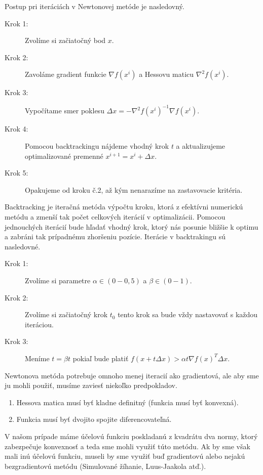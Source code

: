 Postup pri iteráciách v Newtonovej metóde je nasledovný.
\begin{description}
	\item[Krok 1:] {Zvolíme si začiatočný bod $x$.}
	\item[Krok 2:] {Zavoláme gradient funkcie $\nabla f(x^{i})$ a Hessovu maticu $\nabla^{2} f(x^{i})$.}
	\item[Krok 3:] {Vypočítame smer poklesu $\Delta x = -\nabla^{2}f(x^{i})^{-1} \nabla f(x^{i})$.}
	\item[Krok 4:] {Pomocou backtrackingu nájdeme vhodný krok $t$ a aktualizujeme optimalizované premenné $x^{i+1} = x^{i} + \Delta x $.}
	\item[Krok 5:] {Opakujeme od kroku č.2, až kým nenarazíme na zastavovacie kritéria.}
\end{description}
Backtracking je iteračná metóda výpočtu kroku, ktorá z efektívni numerickú metódu a zmenší tak počet celkových iterácií v optimalizácii. Pomocou jednouchých iterácií bude hľadať vhodný krok, ktorý nás posunie bližšie k optimu a zabráni tak prípadnému zhoršeniu pozície. Iterácie v backtrakingu sú nasledovné.
\begin{description}
	\item[Krok 1:] {Zvolíme si parametre $\alpha \in (0-0,5)$ a $\beta \in (0-1)$.}
	\item[Krok 2:] {Zvolíme si začiatočný krok $t_0$ tento krok sa bude vždy nastavovať s každou iteráciou.}
	\item[Krok 3:] {Meníme $t=\beta t$ pokiaľ bude platiť $f(x+t\Delta x) > \alpha t\nabla f(x)^{T}\Delta x$.}
\end{description}
Newtonova metóda potrebuje omnoho menej iteracií ako gradientová, ale aby sme ju mohli použiť, musíme zaviesť niekoľko predpokladov.
\begin{enumerate}
	\item{
		Hessova matica musí byť kladne definitný (funkcia musí byť konvexná).
	}
	\item{
		Funkcia musí byť dvojito spojite diferencovateľná.
	}
\end{enumerate}
V našom prípade máme účelovú funkciu poskladanú z kvadrátu dva normy, ktorý zabezpečuje konvexnosť a teda sme mohli využiť túto metódu. Ak by sme však mali inú účelovú funkciu, museli by sme využiť buď gradientovú  alebo nejakú bezgradientovú metódu (Simulované žíhanie, Luus-Jaakola atď.).

